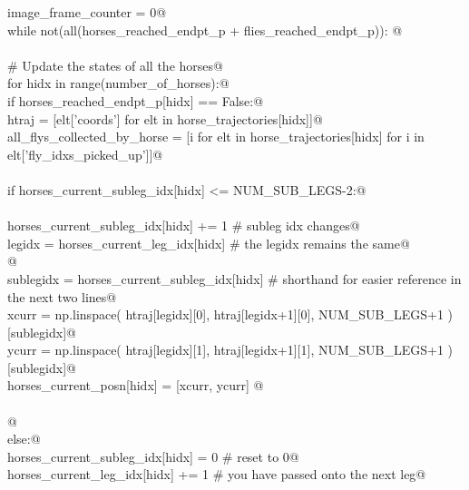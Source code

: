 \documentclass[12.0pt]{report}
\begin{document}
\begin{appendices}
\begin{flushleft}
\begin{list}{}{}
\mbox{}\verb@    image_frame_counter = 0@\\
\mbox{}\verb@    while not(all(horses_reached_endpt_p + flies_reached_endpt_p)): @\\
\mbox{}\verb@@\\
\mbox{}\verb@        # Update the states of all the horses@\\
\mbox{}\verb@        for hidx in range(number_of_horses):@\\
\mbox{}\verb@            if horses_reached_endpt_p[hidx] == False:@\\
\mbox{}\verb@                htraj                       = [elt['coords'] for elt in horse_trajectories[hidx]]@\\
\mbox{}\verb@                all_flys_collected_by_horse = [i             for elt in horse_trajectories[hidx] for i in elt['fly_idxs_picked_up']]@\\
\mbox{}\verb@@\\
\mbox{}\verb@                if horses_current_subleg_idx[hidx] <= NUM_SUB_LEGS-2:@\\
\mbox{}\verb@@\\
\mbox{}\verb@                    horses_current_subleg_idx[hidx] += 1     # subleg idx changes@\\
\mbox{}\verb@                    legidx    = horses_current_leg_idx[hidx] # the legidx remains the same@\\
\mbox{}\verb@                    @\\
\mbox{}\verb@                    sublegidx = horses_current_subleg_idx[hidx] # shorthand for easier reference in the next two lines@\\
\mbox{}\verb@                    xcurr = np.linspace( htraj[legidx][0], htraj[legidx+1][0], NUM_SUB_LEGS+1 )[sublegidx]@\\
\mbox{}\verb@                    ycurr = np.linspace( htraj[legidx][1], htraj[legidx+1][1], NUM_SUB_LEGS+1 )[sublegidx]@\\
\mbox{}\verb@                    horses_current_posn[hidx]  = [xcurr, ycurr] @\\
\mbox{}\verb@@\\
\mbox{}\verb@                    @\\
\mbox{}\verb@                else:@\\
\mbox{}\verb@                    horses_current_subleg_idx[hidx] = 0 # reset to 0@\\
\mbox{}\verb@                    horses_current_leg_idx[hidx]   += 1 # you have passed onto the next leg@\\

\end{list}
\end{flushleft}
\end{appendices}
\end{document}
